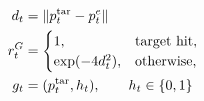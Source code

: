 \documentclass[border=8pt,12pt]{standalone}
\begin{document}
\color{ink}
$\displaystyle \begin{aligned}d_t&=\|p_t^{\rm tar}-p_t^e\|\\ r_t^G&=\begin{cases}1,&\text{target hit},\\ \exp(-4d_t^2),&\text{otherwise},\end{cases}\\ g_t&=(p_t^{\rm tar},h_t),\qquad h_t\in\{0,1\}\end{aligned}$
\end{document}
